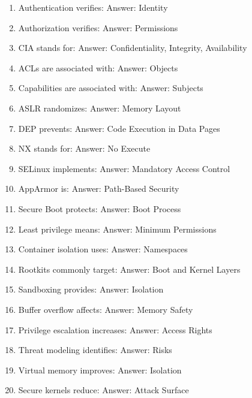 \begin{enumerate}
\item Authentication verifies:
Answer: Identity

\item Authorization verifies:
Answer: Permissions

\item CIA stands for:
Answer: Confidentiality, Integrity, Availability

\item ACLs are associated with:
Answer: Objects

\item Capabilities are associated with:
Answer: Subjects

\item ASLR randomizes:
Answer: Memory Layout

\item DEP prevents:
Answer: Code Execution in Data Pages

\item NX stands for:
Answer: No Execute

\item SELinux implements:
Answer: Mandatory Access Control

\item AppArmor is:
Answer: Path-Based Security

\item Secure Boot protects:
Answer: Boot Process

\item Least privilege means:
Answer: Minimum Permissions

\item Container isolation uses:
Answer: Namespaces

\item Rootkits commonly target:
Answer: Boot and Kernel Layers

\item Sandboxing provides:
Answer: Isolation

\item Buffer overflow affects:
Answer: Memory Safety

\item Privilege escalation increases:
Answer: Access Rights

\item Threat modeling identifies:
Answer: Risks

\item Virtual memory improves:
Answer: Isolation

\item Secure kernels reduce:
Answer: Attack Surface
\end{enumerate}

